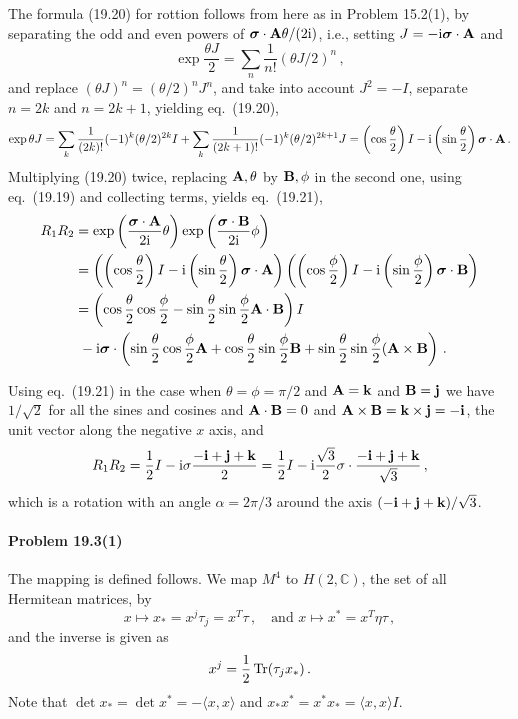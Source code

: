 \documentclass[a4paper,12pt]{article}
\def\imagi{\mathrm{i}}
\def\Tr{\ensuremath{\mathop{\rm Tr}}}
\newcommand{\problem}[1]{\paragraph{Problem #1}}
\begin{document}
The formula (19.20) for rottion follows from here as in Problem 15.2(1), by separating the odd and even powers of $\boldsymbol\sigma\cdot{\bf A}\theta/(2\imagi)$, i.e., setting $J=-\imagi \boldsymbol\sigma\cdot{\bf A}$ and
\[
 \exp \frac{\theta J}{2} = \sum_n \frac{1}{n!}(\theta J/2)^n\,,
\]
and replace $(\theta J)^n = (\theta/2)^n J^n$, and take into account $J^2=-I$, separate $n=2k$ and $n=2k+1$, yielding eq.\ (19.20),
\[
 \exp\theta J = \sum_k \frac{1}{(2k)!}(-1)^k (\theta/2)^{2k} I + \sum_k \frac{1}{(2k+1)!} (-1)^k (\theta/2)^{2k+1} J = \left(\cos\frac{\theta}{2}\right)I-\imagi\left(\sin\frac{\theta}{2}\right)\boldsymbol\sigma\cdot{\bf A}\,.
\]
Multiplying (19.20) twice, replacing ${\bf A}, \theta$ by ${\bf B}, \phi$ in the second one, using eq.\ (19.19) and collecting terms, yields eq.\ (19.21),
\[
 \begin{aligned}
  R_1 R_2 &= \exp\left(\frac{\boldsymbol\sigma\cdot{\bf A}}{2\imagi}\theta\right)\exp\left(\frac{\boldsymbol\sigma\cdot{\bf B}}{2\imagi}\phi\right)\\
  &= \left(\left(\cos\frac{\theta}{2}\right)I-\imagi\left(\sin\frac{\theta}{2}\right)\boldsymbol\sigma\cdot{\bf A}\right)
  \left( \left(\cos\frac{\phi}{2}\right)I-\imagi\left(\sin\frac{\phi}{2}\right)\boldsymbol\sigma\cdot{\bf B}\right)\\
  &= \left(\cos\frac{\theta}{2}\cos\frac{\phi}{2} -\sin\frac{\theta}{2} \sin\frac{\phi}{2}{\bf A}\cdot{\bf B} \right)I\\
  &\ -\imagi\boldsymbol\sigma\cdot\left(\sin\frac{\theta}{2}\cos\frac{\phi}{2}{\bf A} + \cos\frac{\theta}{2}\sin\frac{\phi}{2}{\bf B}+\sin\frac{\theta}{2}\sin\frac{\phi}{2}({\bf A}\times{\bf B}\right)\,.
 \end{aligned}
\]

Using eq.\ (19.21) in the case when $\theta=\phi=\pi/2$ and ${\bf A}={\bf k}$ and ${\bf B} = {\bf j}$ we have $1/\sqrt{2}$ for all the sines and cosines and ${\bf A}\cdot{\bf B} = 0$ and ${\bf A}\times{\bf B} = {\bf k}\times {\bf j} = -{\bf i}$, the unit vector along the negative $x$ axis, and
\[
 R_1 R_2 = \frac{1}{2}I -\imagi{\bf \sigma} \frac{-{\bf i}+{\bf j}+{\bf k}}{2} = \frac{1}{2}I -\imagi \frac{\sqrt{3}}{2}\sigma\cdot\frac{-{\bf i}+{\bf j}+{\bf k}}{\sqrt{3}}\,,
\]
which is a rotation with an angle $\alpha=2\pi/3$ around the axis $(-{\bf i}+{\bf j}+{\bf k})/\sqrt{3}$.


\problem{19.3(1)} The mapping is defined follows. We map $M^4$ to $H(2, \mathbb{C})$, the set of all Hermitean matrices, by
\[
 x\mapsto x_* = x^j\tau_j = x^T \tau\,,\quad\text{and } x\mapsto x^* = x^T\eta \tau\,,
\]
and the inverse is given as
\[
 x^j = \frac{1}{2}\Tr(\tau_j x_*)\,.
\]
Note that $\det x_* = \det x^* = -\langle x, x\rangle$ and $x_* x^* = x^* x_* = \langle x, x\rangle I$.
\end{document}
